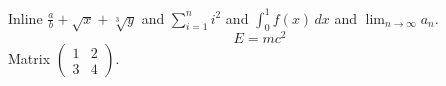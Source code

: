 \documentclass{article}
\begin{document}
Inline $\frac{a}{b}+\sqrt{x}+\sqrt[3]{y}$ and $\sum_{i=1}^{n} i^2$ and $\int_0^1 f(x)\,dx$ and $\lim_{n\to\infty} a_n$.
\begin{equation}\label{e1}
E=mc^2
\end{equation}
Matrix $\begin{pmatrix}1&2\\3&4\end{pmatrix}$.
\end{document}
